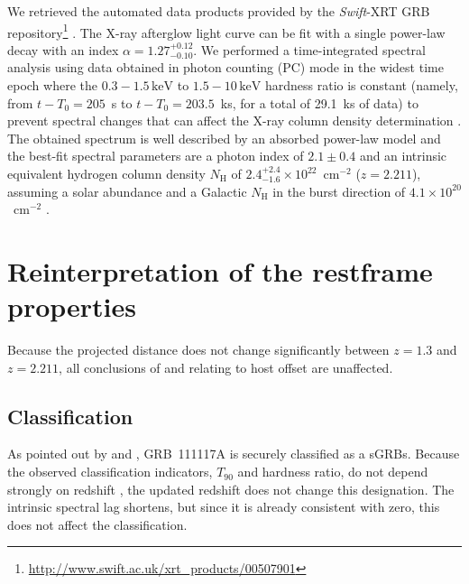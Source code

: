 \documentclass{aa}    %
\begin{document}
We retrieved the automated data products provided by the \textit{Swift}-XRT GRB
repository\footnote{\url{http://www.swift.ac.uk/xrt\_products/00507901}}
\citep{Evans2009}. 
The X-ray afterglow light curve can be fit with a single power-law decay with an
index $\alpha=1.27_{-0.10}^{+0.12}$. We performed a time-integrated spectral
analysis using data obtained in photon counting (PC) mode in the widest time epoch where
the $0.3-1.5\,\mathrm{keV}$ to $1.5-10\,\mathrm{keV}$ hardness ratio is constant
(namely, from $t-T_0 = 205$~s to $t-T_0 = 203.5$~ks, for a total of 29.1~ks of
data) to prevent spectral changes that can affect the X-ray column density
determination \citep{Kopac2012}. 
The obtained spectrum is well described by an absorbed power-law
model and the best-fit spectral parameters are a photon index of $2.1 \pm 0.4$ and
an intrinsic equivalent hydrogen column density $N_{\mathrm{H}}$ of $2.4_{-1.6}^{+2.4}
\times 10^{22}$~cm$^{-2}$ ($z=2.211$), assuming a solar abundance and a Galactic $N_{\mathrm{H}}$ in
the burst direction of $4.1 \times 10^{20}$~cm$^{-2}$ \citep{Willingale2013}.

\section{Reinterpretation of the restframe properties}

Because the projected distance does not change significantly between $z = 1.3$ and $z =
2.211$, all conclusions of \citet{Margutti2012} and \citet{Sakamoto2013}
relating to host offset are unaffected.

\subsection{Classification} \label{classification}

As pointed out by \citet{Margutti2012} and \citet{Sakamoto2013}, GRB~111117A is
securely classified as a sGRBs. Because the observed classification indicators,
$T_{90}$ and hardness ratio, do not depend strongly on redshift
\citep{Littlejohns2013a}, the updated redshift does not change this designation.
The intrinsic spectral lag shortens, but since it is already consistent with
zero, this does not affect the classification.
\end{document}
